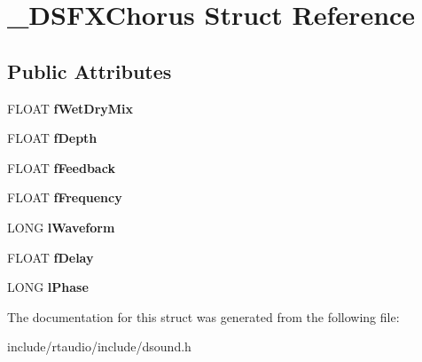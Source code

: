 \hypertarget{struct___d_s_f_x_chorus}{}\section{\+\_\+\+D\+S\+F\+X\+Chorus Struct Reference}
\label{struct___d_s_f_x_chorus}
\subsection*{Public Attributes}
\begin{DoxyCompactItemize}
\item 
F\+L\+O\+AT {\bfseries f\+Wet\+Dry\+Mix}\hypertarget{struct___d_s_f_x_chorus_ad9a663ef8a2c07d34e367d1b6802c6f7}{}\label{struct___d_s_f_x_chorus_ad9a663ef8a2c07d34e367d1b6802c6f7}

\item 
F\+L\+O\+AT {\bfseries f\+Depth}\hypertarget{struct___d_s_f_x_chorus_acb776e6a37b7d53e78d437ac26001981}{}\label{struct___d_s_f_x_chorus_acb776e6a37b7d53e78d437ac26001981}

\item 
F\+L\+O\+AT {\bfseries f\+Feedback}\hypertarget{struct___d_s_f_x_chorus_ab93c38ab2b7611f0d0a9eaea8fe971f2}{}\label{struct___d_s_f_x_chorus_ab93c38ab2b7611f0d0a9eaea8fe971f2}

\item 
F\+L\+O\+AT {\bfseries f\+Frequency}\hypertarget{struct___d_s_f_x_chorus_a3bfd415d655a6c7388e355a7206b0cc5}{}\label{struct___d_s_f_x_chorus_a3bfd415d655a6c7388e355a7206b0cc5}

\item 
L\+O\+NG {\bfseries l\+Waveform}\hypertarget{struct___d_s_f_x_chorus_a1e681399b3476bbc8f9fc4a733239d81}{}\label{struct___d_s_f_x_chorus_a1e681399b3476bbc8f9fc4a733239d81}

\item 
F\+L\+O\+AT {\bfseries f\+Delay}\hypertarget{struct___d_s_f_x_chorus_a0fc41805780b0aeaf90ef7be1ba0c48f}{}\label{struct___d_s_f_x_chorus_a0fc41805780b0aeaf90ef7be1ba0c48f}

\item 
L\+O\+NG {\bfseries l\+Phase}\hypertarget{struct___d_s_f_x_chorus_a89794b68d917857de1eb8c5fa7bdbcb6}{}\label{struct___d_s_f_x_chorus_a89794b68d917857de1eb8c5fa7bdbcb6}

\end{DoxyCompactItemize}


The documentation for this struct was generated from the following file\+:\begin{DoxyCompactItemize}
\item 
include/rtaudio/include/dsound.\+h\end{DoxyCompactItemize}
